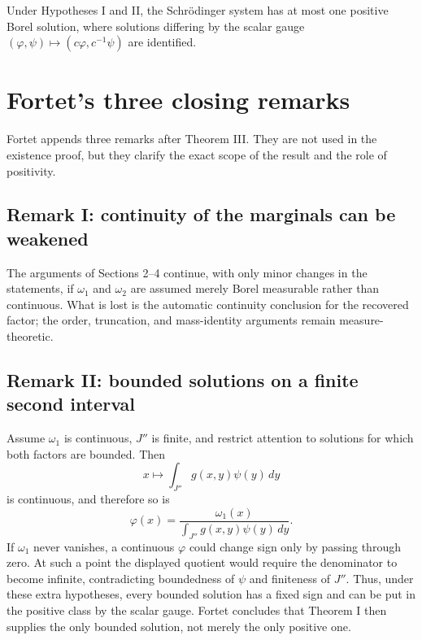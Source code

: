 \begin{theorem}
Under Hypotheses I and II, the Schr\"odinger system has at most one positive
Borel solution, where solutions differing by the scalar gauge
$(\varphi,\psi)\mapsto(c\varphi,c^{-1}\psi)$ are identified.
\end{theorem}


\section{Fortet's three closing remarks}
Fortet appends three remarks after Theorem III.  They are not used in the
existence proof, but they clarify the exact scope of the result and the role
of positivity.

\subsection*{Remark I: continuity of the marginals can be weakened}
The arguments of Sections 2--4 continue, with only minor changes in the
statements, if $\omega_1$ and $\omega_2$ are assumed merely Borel measurable
rather than continuous.  What is lost is the automatic continuity conclusion
for the recovered factor; the order, truncation, and mass-identity arguments
remain measure-theoretic.

\subsection*{Remark II: bounded solutions on a finite second interval}
Assume $\omega_1$ is continuous, $J''$ is finite, and restrict attention to
solutions for which both factors are bounded.  Then
\[
  x\longmapsto \int_{J''}g(x,y)\psi(y)\,dy
\]
is continuous, and therefore so is
\[
  \varphi(x)=
  \frac{\omega_1(x)}{\int_{J''}g(x,y)\psi(y)\,dy}.
\]
If $\omega_1$ never vanishes, a continuous $\varphi$ could change sign only by
passing through zero.  At such a point the displayed quotient would require
the denominator to become infinite, contradicting boundedness of $\psi$ and
finiteness of $J''$.  Thus, under these extra hypotheses, every bounded
solution has a fixed sign and can be put in the positive class by the scalar
gauge.  Fortet concludes that Theorem I then supplies the only bounded
solution, not merely the only positive one.

